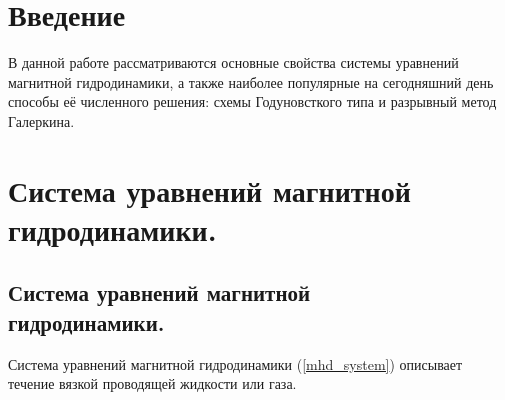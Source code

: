 \documentclass[14pt, a4paper, fleqn]{extreport}
\begin{document}
    \chapter*{Введение}
        
    В данной работе рассматриваются основные свойства 
    системы уравнений магнитной гидродинамики,
    а также наиболее популярные на сегодняшний день способы её численного решения:
    схемы Годуновсткого типа и разрывный метод Галеркина.
        
    \chapter{Система уравнений магнитной гидродинамики.}
    
    \section{Система уравнений магнитной \\
             гидродинамики.}
    
    Система уравнений магнитной гидродинамики (\ref{mhd_system}) описывает
    течение вязкой проводящей жидкости или газа.
    
\end{document}
